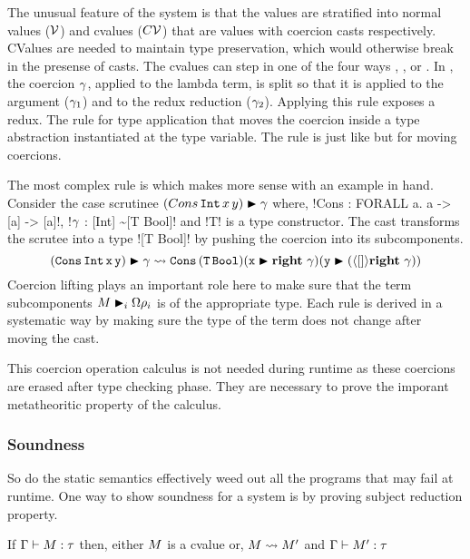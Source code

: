 \documentclass[manuscript,screen,nonacm]{acmart}
\begin{document}
The unusual feature of the system is that the values are stratified into normal values ($\mathcal{V}$) and cvalues ($C\mathcal{V}$) that are values with coercion casts respectively. CValues are needed to maintain type preservation, which would otherwise break in the presense of casts. The cvalues can step in one of the four ways , ,  or . In , the coercion $\gamma$, applied to the lambda term, is split so that it is applied to the argument ($\gamma_1$) and to the redux reduction ($\gamma_2$). Applying this rule exposes a \trule{$\beta$} redux. The rule  for type application that moves the coercion inside a type abstraction instantiated at the type variable.
The rule  is just like  but for moving coercions.

The most complex rule is  which makes more sense with an example in hand. Consider the case scrutinee $(Cons\, \texttt{Int}\, x\, y)\mathrel{\blacktriangleright}\gamma$ where, !Cons : FORALL a. a -> [a] -> [a]!, !$\gamma$ : [Int] \sim [T Bool]! and !T! is a type constructor. The cast transforms the scrutee into a type ![T Bool]! by pushing the coercion into its subcomponents.
$$
(\texttt{Cons}\, \texttt{Int}\, \texttt{x}\, \texttt{y})\mathrel{\blacktriangleright}\gamma \rightsquigarrow \texttt{Cons} \, (\texttt{T}\, \texttt{Bool}) (\texttt{x}\mathrel{\blacktriangleright}\textbf{right}~\gamma) (\texttt{y}\mathrel{\blacktriangleright}(\langle[]\rangle\textbf{right}~\gamma))
$$
Coercion lifting plays an important role here to make sure that the term subcomponents $M\mathrel{\blacktriangleright}_i {\Omega}\rho_i$ is of the appropriate type. Each rule is derived in a systematic way by making sure the type of the term does not change after moving the cast.

This coercion operation calculus is not needed during runtime as these coercions are erased after type checking phase. They are necessary to prove the imporant metatheoritic property of the calculus.

\subsubsection{Soundness}
So do the static semantics effectively weed out all the programs that may fail at runtime. One way to show soundness for a system is by proving subject reduction property.

\begin{theorem}
  If $\Gamma \vdash M : \tau$ then, either $M$ is a cvalue or, $M \rightsquigarrow M'$ and
  $\Gamma \vdash M' : \tau$
\end{theorem}
\end{document}

